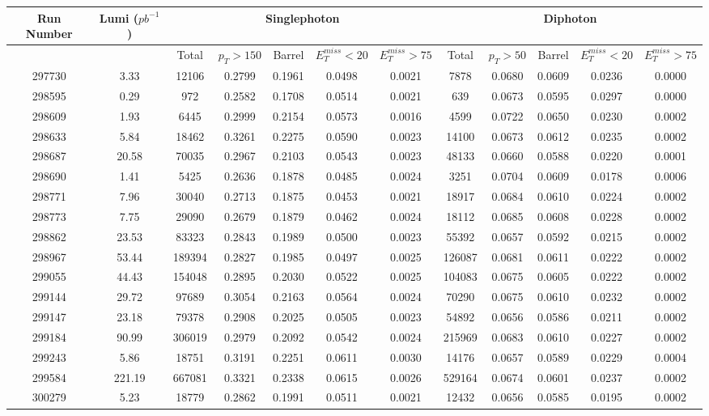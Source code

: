 \documentclass[10pt]{extarticle}
\begin{document}
\begin{longtable}{|c|c|c|c|c|c|c|c|c|c|c|c|}
\hline 
Run Number & Lumi ($pb^{-1}$) & \multicolumn{5}{|c|}{Singlephoton} & \multicolumn{5}{|c|}{Diphoton} \\ 
\hline 
 & & Total & $p_{T} > 150$ & Barrel & $E_{T}^{miss} < 20$ & $E_{T}^{miss} > 75$ & Total & $p_{T} > 50$ & Barrel & $E_{T}^{miss} < 20$ & $E_{T}^{miss} > 75$ \\ 
\hline 
297730&3.33&12106&0.2799&0.1961&0.0498&0.0021&7878&0.0680&0.0609&0.0236&0.0000 \\ 
\hline 
298595&0.29&972&0.2582&0.1708&0.0514&0.0021&639&0.0673&0.0595&0.0297&0.0000 \\ 
\hline 
298609&1.93&6445&0.2999&0.2154&0.0573&0.0016&4599&0.0722&0.0650&0.0230&0.0002 \\ 
\hline 
298633&5.84&18462&0.3261&0.2275&0.0590&0.0023&14100&0.0673&0.0612&0.0235&0.0002 \\ 
\hline 
298687&20.58&70035&0.2967&0.2103&0.0543&0.0023&48133&0.0660&0.0588&0.0220&0.0001 \\ 
\hline 
298690&1.41&5425&0.2636&0.1878&0.0485&0.0024&3251&0.0704&0.0609&0.0178&0.0006 \\ 
\hline 
298771&7.96&30040&0.2713&0.1875&0.0453&0.0021&18917&0.0684&0.0610&0.0224&0.0002 \\ 
\hline 
298773&7.75&29090&0.2679&0.1879&0.0462&0.0024&18112&0.0685&0.0608&0.0228&0.0002 \\ 
\hline 
298862&23.53&83323&0.2843&0.1989&0.0500&0.0023&55392&0.0657&0.0592&0.0215&0.0002 \\ 
\hline 
298967&53.44&189394&0.2827&0.1985&0.0497&0.0025&126087&0.0681&0.0611&0.0222&0.0002 \\ 
\hline 
299055&44.43&154048&0.2895&0.2030&0.0522&0.0025&104083&0.0675&0.0605&0.0222&0.0002 \\ 
\hline 
299144&29.72&97689&0.3054&0.2163&0.0564&0.0024&70290&0.0675&0.0610&0.0232&0.0002 \\ 
\hline 
299147&23.18&79378&0.2908&0.2025&0.0505&0.0023&54892&0.0656&0.0586&0.0211&0.0002 \\ 
\hline 
299184&90.99&306019&0.2979&0.2092&0.0542&0.0024&215969&0.0683&0.0610&0.0227&0.0002 \\ 
\hline 
299243&5.86&18751&0.3191&0.2251&0.0611&0.0030&14176&0.0657&0.0589&0.0229&0.0004 \\ 
\hline 
299584&221.19&667081&0.3321&0.2338&0.0615&0.0026&529164&0.0674&0.0601&0.0237&0.0002 \\ 
\hline 
300279&5.23&18779&0.2862&0.1991&0.0511&0.0021&12432&0.0656&0.0585&0.0195&0.0002 \\ 

\end{longtable}
\end{document}
